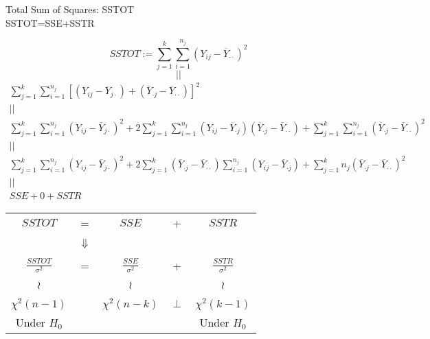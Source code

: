 \begin{frame}[fragile]{Total Sum of Squares: SSTOT\\[0.4em]
	SSTOT=SSE+SSTR}

	\[SSTOT:= \sum_{j=1}^k\sum_{i=1}^{n_j} \left(Y_{ij}-\overline{Y}_{\cdot \cdot} \right)^2
	\]
	\[||\]
	\begin{gather*}
		\sum_{j=1}^k\sum_{i=1}^{n_j}\left[ \left(Y_{ij}-\overline{Y}_{j \cdot} \right)+ \left(\overline{Y}_{\cdot j}-\overline{Y}_{\cdot \cdot} \right) \right]^2
 \\ ||\\
 \sum_{j=1}^k\sum_{i=1}^{n_j}\left(Y_{ij}-\overline{Y}_{j \cdot} \right)^2+2\sum_{j=1}^k\sum_{i=1}^{n_j}\left(Y_{ij}-\overline{Y}_{\cdot j} \right)\left(\overline{Y}_{\cdot j}-\overline{Y}_{\cdot \cdot} \right)+\sum_{j=1}^k\sum_{i=1}^{n_j}\left(\overline{Y}_{\cdot j}-\overline{Y}_{\cdot \cdot} \right)^2
 \\ ||\\
 \sum_{j=1}^k\sum_{i=1}^{n_j}\left(Y_{ij}-\overline{Y}_{j \cdot} \right)^2+2\sum_{j=1}^k\left(\overline{Y}_{\cdot j}-\overline{Y}_{\cdot \cdot} \right)\sum_{i=1}^{n_j}\left(Y_{ij}-\overline{Y}_{\cdot j} \right)+\sum_{j=1}^kn_j\left(\overline{Y}_{\cdot j}-\overline{Y}_{\cdot \cdot} \right)^2
 \\ ||\\
 SSE + 0 + SSTR
	\end{gather*}
\end{frame}
\begin{frame}[fragile]
	\begin{center}
		\begin{tabular}{ccccc}
			$\displaystyle SSTOT$ &
			= &
			$\displaystyle SSE$ &
			+ &
			$\displaystyle SSTR$ \\ \\
			  &$\Downarrow$&&& \\ \\
			$\displaystyle \frac{SSTOT}{\sigma^2}$ &
			= &
			$\displaystyle \frac{SSE}{\sigma^2}$ &
			+ &
			$\displaystyle \frac{SSTR}{\sigma^2}$ \\ \\
			$\wr$&& $\wr$ &  & $\wr$ \\ \\
			$\chi^2(n-1)$ && $\chi^2(n-k)$ & $\perp$ & $\chi^2(k-1)$
			\\[2em]
			Under $H_0$& & \checkmark && Under $H_0$
		\end{tabular}
	\end{center}
\end{frame}
